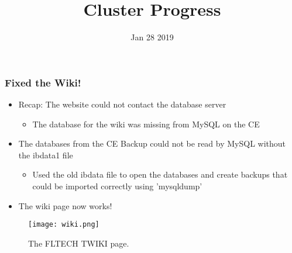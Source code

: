 \documentclass{beamer}
\title{Cluster Progress}
\date{Jan 28 2019}
\begin{document}

\begin{frame}
\titlepage
\end{frame}



\begin{frame}

  \frametitle{Fixed the Wiki!}
  \begin{itemize}
  \item Recap: The website could not contact the database server
    \begin{itemize}
    \item The database for the wiki was missing from MySQL on the CE
    \end{itemize}
  \item The databases from the CE Backup could not be read by MySQL without the ibdata1 file
    \begin{itemize}
    \item Used the old ibdata file to open the databases and create backups that could be imported correctly using 'mysqldump'
    \end{itemize}
    \item The wiki page now works!
    \end{itemize}
  \begin{figure}[H]
    \begin{center}
      \texttt{[image: wiki.png]}
    \end{center}
    \caption{The FLTECH TWIKI page.}
  \end{figure}

\end{frame}


\end{document}
